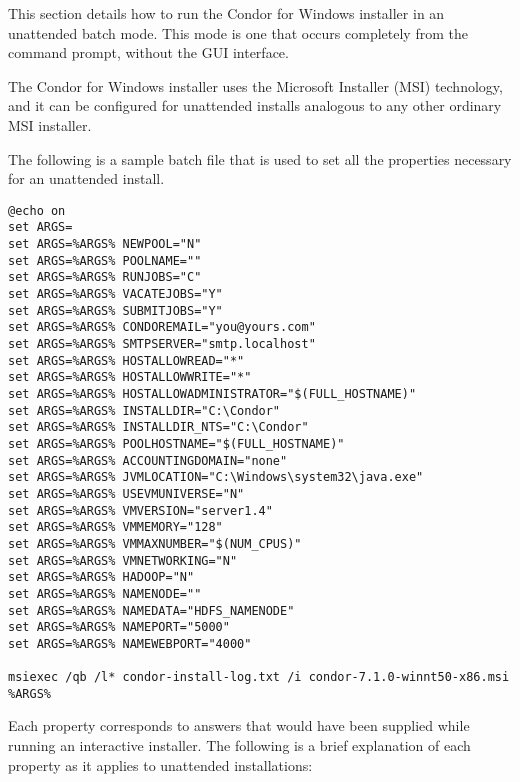 This section details how to run the Condor for Windows installer in an
unattended batch mode.
This mode is one that occurs completely from the command prompt,
without the GUI interface.

The Condor for Windows installer uses the Microsoft Installer (MSI)
technology, and it can be configured for unattended installs analogous
to any other ordinary MSI installer.

The following is a sample batch file that is used to set all the
properties necessary for an unattended install.

\begin{verbatim}
@echo on
set ARGS=
set ARGS=%ARGS% NEWPOOL="N"
set ARGS=%ARGS% POOLNAME=""
set ARGS=%ARGS% RUNJOBS="C"
set ARGS=%ARGS% VACATEJOBS="Y"
set ARGS=%ARGS% SUBMITJOBS="Y"
set ARGS=%ARGS% CONDOREMAIL="you@yours.com"
set ARGS=%ARGS% SMTPSERVER="smtp.localhost"
set ARGS=%ARGS% HOSTALLOWREAD="*"
set ARGS=%ARGS% HOSTALLOWWRITE="*"
set ARGS=%ARGS% HOSTALLOWADMINISTRATOR="$(FULL_HOSTNAME)"
set ARGS=%ARGS% INSTALLDIR="C:\Condor"
set ARGS=%ARGS% INSTALLDIR_NTS="C:\Condor"
set ARGS=%ARGS% POOLHOSTNAME="$(FULL_HOSTNAME)"
set ARGS=%ARGS% ACCOUNTINGDOMAIN="none"
set ARGS=%ARGS% JVMLOCATION="C:\Windows\system32\java.exe"
set ARGS=%ARGS% USEVMUNIVERSE="N"
set ARGS=%ARGS% VMVERSION="server1.4"
set ARGS=%ARGS% VMMEMORY="128"
set ARGS=%ARGS% VMMAXNUMBER="$(NUM_CPUS)"
set ARGS=%ARGS% VMNETWORKING="N"
set ARGS=%ARGS% HADOOP="N"
set ARGS=%ARGS% NAMENODE=""
set ARGS=%ARGS% NAMEDATA="HDFS_NAMENODE"
set ARGS=%ARGS% NAMEPORT="5000"
set ARGS=%ARGS% NAMEWEBPORT="4000"

msiexec /qb /l* condor-install-log.txt /i condor-7.1.0-winnt50-x86.msi %ARGS%
\end{verbatim}

Each property corresponds to answers that would have been
supplied while running an interactive installer.
The following is a brief explanation of each property
as it applies to unattended installations:

